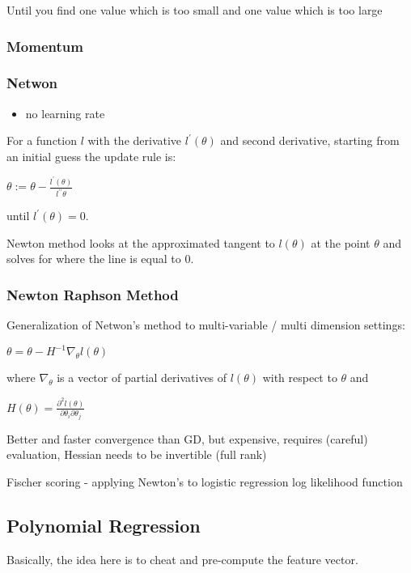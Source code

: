 Until you find one value which is too small and one value which is too large

\subsubsection{Momentum}

\subsubsection{Netwon}

\begin{itemize}
\item no learning rate
\end{itemize}

For a function $l$ with the derivative $l^\prime(\theta)$ and second derivative, starting from an initial guess the update rule is:

$\theta := \theta - \frac{l^\prime(\theta)}{l^{\prime\prime}\theta}$

until $l^\prime(\theta)=0$. 

Newton method looks at the approximated tangent to $l(\theta)$ at the point $\theta$ and solves for where the line is equal to 0.

\subsubsection{Newton Raphson Method}

Generalization of Netwon's method to multi-variable / multi dimension settings:

$\theta = \theta - H^{-1}\nabla_\theta l(\theta)$

where $\nabla_\theta$ is a vector of partial derivatives of $l(\theta)$ with respect to $\theta$ and 

$H(\theta)=\frac{\partial^2 l(\theta)}{\partial \theta_i\partial\theta_j}$

Better and faster convergence than GD, but expensive, requires (careful) evaluation, Hessian needs to be invertible (full rank)

Fischer scoring - applying Newton's to logistic regression log likelihood function

\subsection{Polynomial Regression}

Basically, the idea here is to cheat and pre-compute the feature vector. 

